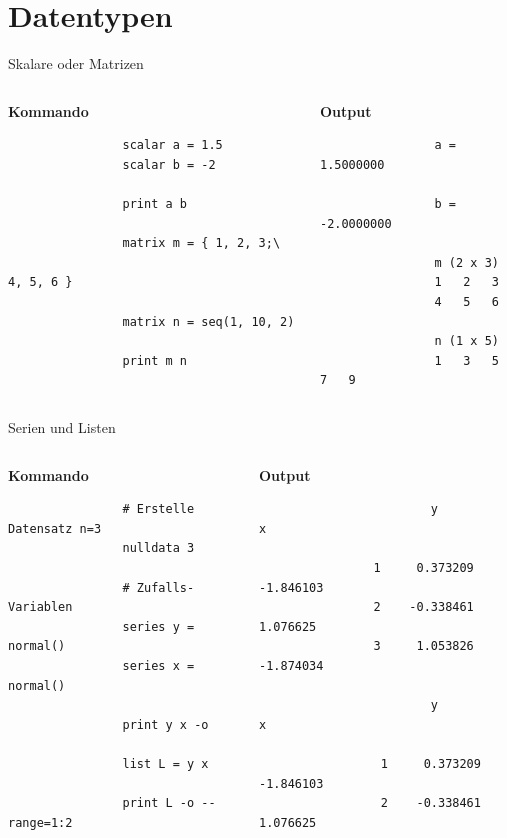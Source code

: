 \documentclass{beamer}[11pt]
\begin{document}
\section{Datentypen}

\begin{frame}[fragile]{Skalare oder Matrizen}
	\begin{columns}[T] %
		\begin{column}{.5\textwidth}
			\textbf{Kommando}
			\begin{verbatim}
				scalar a = 1.5
				scalar b = -2

				print a b

				matrix m = { 1, 2, 3;\
							             4, 5, 6 }

				matrix n = seq(1, 10, 2)

				print m n
			\end{verbatim}
		\end{column}

		\begin{column}{.5\textwidth}
			\textbf{Output}
			\begin{verbatim}
				a =  1.5000000

				b = -2.0000000

				m (2 x 3)
				1   2   3
				4   5   6

				n (1 x 5)
				1   3   5   7   9
			\end{verbatim}
	  \end{column}
	\end{columns}
\end{frame}

\begin{frame}[fragile]{Serien und Listen}
	\begin{columns}[T] %
		\begin{column}{.5\textwidth}
			\textbf{Kommando}
			\begin{verbatim}
				# Erstelle Datensatz n=3
				nulldata 3

				# Zufalls-Variablen
				series y = normal()
				series x = normal()

				print y x -o

				list L = y x

				print L -o --range=1:2
			\end{verbatim}
		\end{column}

		\begin{column}{.5\textwidth}
			\textbf{Output}
			\begin{verbatim}
        				y            x

				1     0.373209    -1.846103
				2    -0.338461     1.076625
				3     1.053826    -1.874034

		         		y            x

				 1     0.373209    -1.846103
				 2    -0.338461     1.076625
			\end{verbatim}
	  \end{column}
	\end{columns}
\end{frame}
\end{document}
